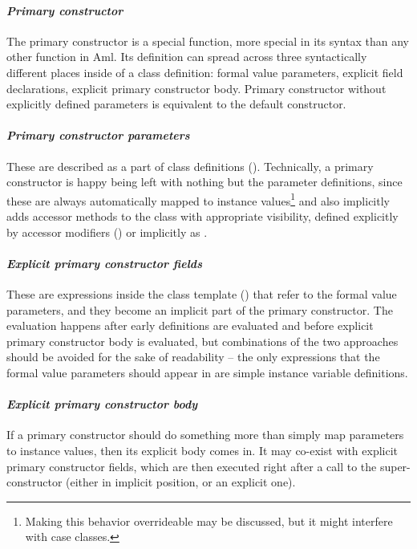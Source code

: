\paragraph{\em Primary constructor}
The primary constructor is a special function, more special in its syntax than any other function in Aml. Its definition can spread across three syntactically different places inside of a class definition: formal value parameters, explicit field declarations, explicit primary constructor body. Primary constructor without explicitly defined parameters is equivalent to the default constructor. 

\paragraph{\em Primary constructor parameters}
These are described as a part of class definitions (). Technically, a primary constructor is happy being left with nothing but the parameter definitions, since these are always automatically mapped to instance values\footnote{Making this behavior overrideable may be discussed, but it might interfere with case classes.} and also implicitly adds accessor methods to the class with appropriate visibility, defined explicitly by accessor modifiers () or implicitly as . 

\paragraph{\em Explicit primary constructor fields}
These are expressions inside the class template () that refer to the formal value parameters, and they become an implicit part of the primary constructor. The evaluation happens after early definitions are evaluated and before explicit primary constructor body is evaluated, but combinations of the two approaches should be avoided for the sake of readability -- the only expressions that the formal value parameters should appear in are simple instance variable definitions. 

\paragraph{\em Explicit primary constructor body}
If a primary constructor should do something more than simply map parameters to instance values, then its explicit body comes in. It may co-exist with explicit primary constructor fields, which are then executed right after a call to the super-constructor (either in implicit position, or an explicit one). 

